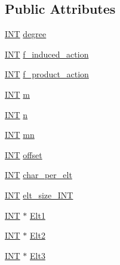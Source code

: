 \subsection*{Public Attributes}
\begin{DoxyCompactItemize}
\item 
\mbox{\hyperlink{galois_8h_a09fddde158a3a20bd2dcadb609de11dc}{I\+NT}} \mbox{\hyperlink{classperm__group_a6b0f5c7c09de360442adfb9263b59242}{degree}}
\item 
\mbox{\hyperlink{galois_8h_a09fddde158a3a20bd2dcadb609de11dc}{I\+NT}} \mbox{\hyperlink{classperm__group_a920db0d0b8ee7ed486917591d108bc1d}{f\+\_\+induced\+\_\+action}}
\item 
\mbox{\hyperlink{galois_8h_a09fddde158a3a20bd2dcadb609de11dc}{I\+NT}} \mbox{\hyperlink{classperm__group_a78f62caa0e1852f5f038d586050a52aa}{f\+\_\+product\+\_\+action}}
\item 
\mbox{\hyperlink{galois_8h_a09fddde158a3a20bd2dcadb609de11dc}{I\+NT}} \mbox{\hyperlink{classperm__group_a1b0cc375208b3e7c8da7c9caf38fbc0e}{m}}
\item 
\mbox{\hyperlink{galois_8h_a09fddde158a3a20bd2dcadb609de11dc}{I\+NT}} \mbox{\hyperlink{classperm__group_aca09b99f70d6bffb5bfb0b6a7b105403}{n}}
\item 
\mbox{\hyperlink{galois_8h_a09fddde158a3a20bd2dcadb609de11dc}{I\+NT}} \mbox{\hyperlink{classperm__group_af2d9fd248ae040958eb9f9a0422d4977}{mn}}
\item 
\mbox{\hyperlink{galois_8h_a09fddde158a3a20bd2dcadb609de11dc}{I\+NT}} \mbox{\hyperlink{classperm__group_a1ab1da81ffb5582ae40cdcb7d5c21619}{offset}}
\item 
\mbox{\hyperlink{galois_8h_a09fddde158a3a20bd2dcadb609de11dc}{I\+NT}} \mbox{\hyperlink{classperm__group_a0c250c39dff029a65222a0aa7d9f48d7}{char\+\_\+per\+\_\+elt}}
\item 
\mbox{\hyperlink{galois_8h_a09fddde158a3a20bd2dcadb609de11dc}{I\+NT}} \mbox{\hyperlink{classperm__group_a5a20f04c161cae52d72653978897a60a}{elt\+\_\+size\+\_\+\+I\+NT}}
\item 
\mbox{\hyperlink{galois_8h_a09fddde158a3a20bd2dcadb609de11dc}{I\+NT}} $\ast$ \mbox{\hyperlink{classperm__group_a57175e64b4d158190336ff0539c29a65}{Elt1}}
\item 
\mbox{\hyperlink{galois_8h_a09fddde158a3a20bd2dcadb609de11dc}{I\+NT}} $\ast$ \mbox{\hyperlink{classperm__group_a3e6f932c12a762619cb5967a36dba904}{Elt2}}
\item 
\mbox{\hyperlink{galois_8h_a09fddde158a3a20bd2dcadb609de11dc}{I\+NT}} $\ast$ \mbox{\hyperlink{classperm__group_ab0fa3c449a63db50aacc24ddb7f601be}{Elt3}}

\end{DoxyCompactItemize}
